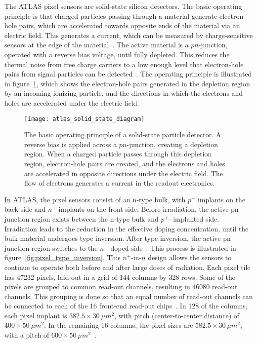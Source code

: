 The ATLAS pixel sensors are solid-state silicon detectors.
The basic operating principle is that charged particles passing through a material generate electron-hole pairs, which are accelerated towards opposite ends of the material via an electric field.
This generates a current, which can be measured by charge-sensitive sensors at the edge of the material~\cite{spieler-2005}.
The active material is a $pn$-junction, operated with a reverse bias voltage, until fully depleted.
This reduces the thermal noise from free charge carriers to a low enough level that electron-hole pairs from signal particles can be detected~\cite{spieler-2005}.
The operating principle is illustrated in figure~\ref{fig:solid_state_diagram}, which shows the electron-hole pairs generated in the depletion region by an incoming ionizing particle, and the directions in which the electrons and holes are accelerated under the electric field.

\begin{figure}[!ht]\centering
\texttt{[image: atlas\_solid\_state\_diagram]}
\caption{The basic operating principle of a solid-state particle detector. A reverse bias is applied across a $pn$-junction, creating a depletion region.
When a charged particle passes through this depletion region, electron-hole pairs are created, and the electrons and holes are accelerated in opposite directions under the electric field.
The flow of electrons generates a current in the readout electronics.}\label{fig:solid_state_diagram}
\end{figure}

In ATLAS, the pixel sensors consist of an n-type bulk, with $p^+$ implants on the back side and $n^+$ implants on the front side.
Before irradiation, the active pn junction region exists between the n-type bulk and $p^+$- implanted side.
Irradiation leads to the reduction in the effective doping concentration, until the bulk material undergoes type inversion.
After type inversion, the active pn junction region switches to the $n^+$-doped side~\cite{pixels-2008}.
This process is illustrated in figure~\ref{fig:pixel_type_inversion}.
This $n^+$-in-$n$ design allows the sensors to continue to operate both before and after large doses of radiation.
Each pixel tile has 47232 pixels, laid out in a grid of 144 columns by 328 rows.
Some of the pixels are grouped to common read-out channels, resulting in 46080 read-out channels.
This grouping is done so that an equal number of read-out channels can be connected to each of the 16 front-end read-out chips~\cite{pixels-2008}.
In 128 of the columns, each pixel implant is $382.5\times30~\mu m^2$, with pitch (center-to-center distance) of  $400\times50~\mu m^2$.
In the remaining 16 columns, the pixel sizes are $582.5\times30~\mu m^2$, with a pitch of  $600\times50~\mu m^2$~\cite{pixels-2008}.

